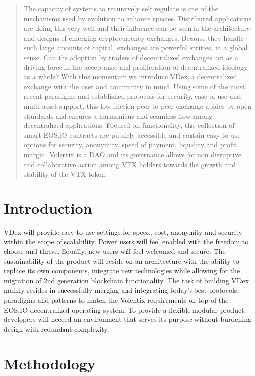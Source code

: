 \documentclass[]{article}
\begin{document}
\begin{abstract}
The capacity of systems to recursively self regulate is one of the mechanisms used by evolution to enhance species. Distributed applications are doing this very well and their influence can be seen in the architecture
and designs of emerging cryptocurrency exchanges. Because they handle such large amounts of capital, exchanges are powerful entities, in a global sense. 
Can the adoption by traders of decentralized exchanges act as a driving force in the acceptance and proliferation of decentralized ideology as a whole? 
With this momentum we introduce VDex, a decentralized exchange 
with the user and community in mind. Using some of the most recent paradigms 
and established protocols for security, ease of use and multi asset support, 
this low friction peer-to-peer exchange abides by open standards and ensures 
a harmonious and seamless flow among decentralized applications. 
Focused on functionality, this collection of smart EOS.IO contracts are 
publicly accessible and contain easy to use options for security, anonymity, 
speed of payment, liquidity and profit margin.
Volentix is a DAO and its governance allows for non disruptive and collaborative action among VTX holders towards the growth and stability of the VTX token.
\end{abstract}
\section{Introduction}

VDex will provide easy to use settings for speed, cost, anonymity and security within the scope of scalability. Power users will feel enabled with the freedom to choose and thrive. Equally, new users will feel welcomed and secure. The sustainability of the product will reside on an architecture 
with the ability to replace its own components, integrate new technologies while allowing for the migration of 2nd generation blockchain functionality.  
The task of building VDex mainly resides in successfully merging
and integrating today's best protocols, paradigms and patterns to match the 
Volentix requirements on top of the EOS.IO decentralized operating system.
To provide a flexible modular product, developers will needed an environment that serves its purpose without burdening design with redundant complexity. 
 	
\section{Methodology}
\end{document}
